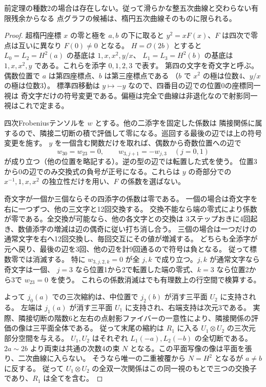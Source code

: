 \begin{theorem}\label{thm:genus-two-quintic-exclusion}
前定理の種数2の場合は存在しない。従って滑らかな整五次曲線と交わらない有限残余からなる
点グラフの候補は、楕円五次曲線そのものに限られる。
\end{theorem}
\begin{proof}
超楕円座標 $x$ の零と極を $a,b$ の下に取ると
$y^2=x F(x)$、$F$ は四次で零点は互いに異なり $F(0)\ne0$ となる。
$H=\mathcal O(2b)$ とすると $L_0=L_2=H^2(a)$ の基底は $1,x,x^2,y/x$、
$L_1=L_3=H^2(b)$ の基底は $1,x,x^2,y$ である。これらを添字 $0,1,2,3$ で表す。
第四の文字を奇文字と呼ぶ。偶数位置で $a$ は第四座標点、$b$ は第三座標点である
（$b$ で $x^2$ の極は位数4、$y/x$ の極は位数3）。
標準四移動は $y\mapsto-y$ なので、四番目の辺での位置0の座標同一視は
奇文字だけの符号変更である。偏極は完全で曲線は非退化なので射影同一視はこれで定まる。

四次Frobeniusテンソルを $w$ とする。他の二添字を固定した係数は
隣接関係に属するので、隣接二切断の積で評価して零になる。巡回する最後の辺では上の符号変更を施す。
$y$ を一個含む関数だけを取れば、偶数から奇数位置への辺で
\[
 w_{30}=w_{23}=0,\qquad w_{3,j+1}=-w_{j,3}\quad(j=0,1)
\]
が成り立つ（他の位置を略記する）。逆の型の辺では転置した式を使う。
位置3から0の辺でのみ交換式の負号が正号になる。これらは $y$ の奇部分での
$x^{-1},1,x,x^2$ の独立性だけを用い、$F$ の係数を選ばない。

奇文字が一個か三個ならその四添字の係数は零である。
一個の場合は奇文字を右に一つずつ、他の三文字と12回交換する。
交換不能なら端の零式により係数が零である。全交換が可能なら、他の各文字との交換は
3ステップおきに4回起き、数値添字の増減は辺の偶奇に従い打ち消し合う。
三個の場合は一つだけの通常文字を右へ12回交換し、毎回交互にその値が増減する。
どちらも全添字が元へ戻り、最後の辺を3回、他の辺を計9回通るので符号は負となる。
従って標数零では消滅する。
特に $w_{3,j,2,k}=0$ が全 $j,k$ で成り立つ。$j,k$ が通常文字なら奇文字は一個、
$j=3$ なら位置1から2で転置した端の零式、$k=3$ なら位置2から3で $w_{23}=0$ を使う。
これらの係数消滅はでも有理数上の行空間で検算する。

よって $j_0(a)$ での三次縮約は、中位置で $j_2(b)$ が消す三平面 $U_2$ に支持される。
左端は $j_1(a)$ が消す三平面 $U_1$ に支持され、右端支持は次元3である。
実際、隣接切断の階数6と左右の点射影ファイバーの一意性により、隣接関係の評価の像は三平面全体である。
従って末尾の縮約は $R_1$ に入る $U_1\otimes U_2$ の三次元部分空間を与える。
$U_1,U_2$ はそれぞれ $L_1(-a),L_2(-b)$ の全切断である。
$2a\sim2b$ より両束は共通の次数4の束 $N$ となる。この平面写像の像は平面を張り、二次曲線に入らない。
そうなら唯一の二重被覆から $N=H^2$ となるが $a\ne b$ に反する。
従って $U_1\otimes U_2$ の全双一次関係はこの同一視のもとで三つの交換子であり、$R_1$ は全てを含む。


\end{proof}
